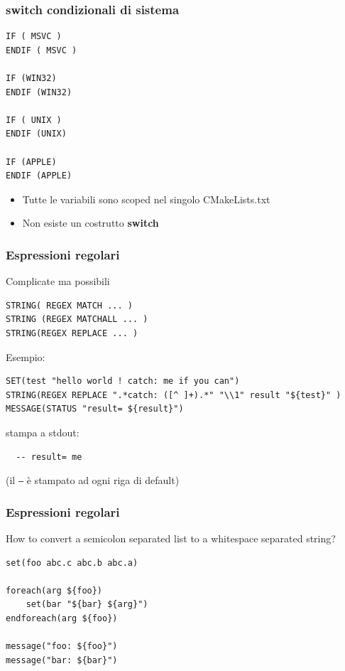 \documentclass[10pt] {beamer}
\begin{document}
\begin{frame}[fragile]
\frametitle{switch condizionali di sistema}
\begin{verbatim}
IF ( MSVC )
ENDIF ( MSVC )

IF (WIN32)
ENDIF (WIN32)
 		
IF ( UNIX )
ENDIF (UNIX)
 		
IF (APPLE)
ENDIF (APPLE)
\end{verbatim}
\begin{itemize}
\item Tutte le variabili sono scoped nel singolo CMakeLists.txt
\item Non esiste un costrutto \textbf{switch}
\end{itemize}
\end{frame}


\begin{frame}[fragile]
\frametitle{ Espressioni regolari}
Complicate ma possibili
\begin{verbatim}
STRING( REGEX MATCH ... )
STRING (REGEX MATCHALL ... )
STRING(REGEX REPLACE ... )
\end{verbatim}
Esempio:
\begin{verbatim}
SET(test "hello world ! catch: me if you can")
STRING(REGEX REPLACE ".*catch: ([^ ]+).*" "\\1" result "${test}" )
MESSAGE(STATUS "result= ${result}")
\end{verbatim}
stampa a stdout:
\begin{verbatim}
  -- result= me
\end{verbatim}
(il \texttt{--} è stampato ad ogni riga di default)
\end{frame}




\begin{frame}[fragile]
 \frametitle{ Espressioni regolari }
How to convert a semicolon separated list to a whitespace separated string?
\begin{verbatim}
set(foo abc.c abc.b abc.a)

foreach(arg ${foo})
    set(bar "${bar} ${arg}")
endforeach(arg ${foo})
 
message("foo: ${foo}")
message("bar: ${bar}")
\end{verbatim}
\end{frame}
\end{document}
